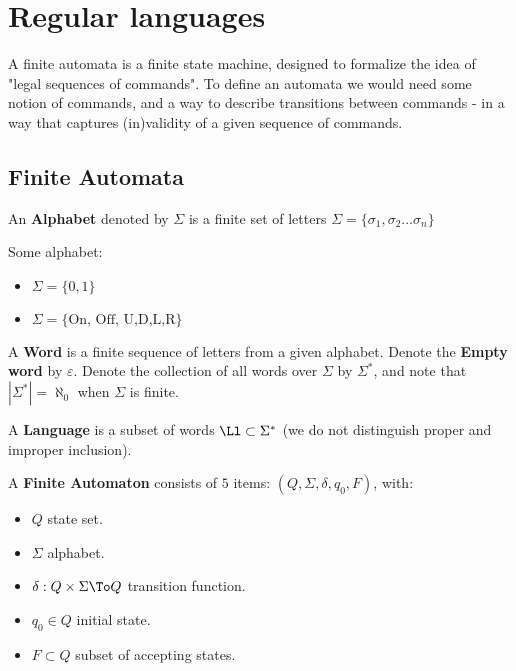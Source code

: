 \chapter{Regular languages}
A finite automata is a finite state machine, designed to formalize the idea of "legal sequences of commands". To define an automata we would need some notion of commands, and a way to describe transitions between commands - in a way that captures (in)validity of a given sequence of commands.
\section{Finite Automata}
\begin{yellowBox}
	\begin{defn}[Alphabet] An \textbf{Alphabet} denoted by $\Sigma$ is a finite set of letters $\Sigma = \{\sigma_1, \sigma_2\ldots \sigma_n\}$
	\end{defn}
\end{yellowBox}
\begin{example} Some alphabet:
	\begin{itemize}
		\item $\Sigma = \{0,1\}$
		\item $ \Sigma = \{\text{On, Off, U,D,L,R}\}$
	\end{itemize}
\end{example}
\begin{yellowBox}
	\begin{defn} A \textbf{Word} is a finite sequence of letters from a given alphabet. Denote the \textbf{Empty word} by $\varepsilon$. Denote the collection of all words over $\Sigma$ by $\Sigma^*$, and note that $|\Sigma^*| = \aleph_0$ when $\Sigma$ is finite.
	\end{defn}
	\begin{defn}[Language] A \textbf{Language} is a subset of words $\Ll\subset \Sigma^*$ (we do not distinguish proper and improper inclusion).
	\end{defn}
	\begin{defn} A \textbf{Finite Automaton} consists of $5$ items: $(Q,\Sigma, \delta, q_0, F)$, with:
		\begin{itemize}
			\item $Q$ state set.
			\item $\Sigma$ alphabet.
			\item $\delta: Q\times \Sigma \To Q$ transition function.
			\item $q_0\in Q$ initial state.
			\item $F\subset Q$ subset of accepting states.
		\end{itemize}
	\end{defn}
\end{yellowBox}
